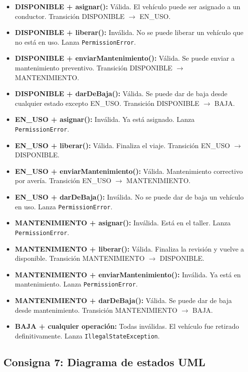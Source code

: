 \begin{itemize}
    \item \textbf{DISPONIBLE + asignar():} Válida. El vehículo puede ser asignado a un conductor. Transición DISPONIBLE $\rightarrow$ EN\_USO.
    \item \textbf{DISPONIBLE + liberar():} Inválida. No se puede liberar un vehículo que no está en uso. Lanza \texttt{PermissionError}.
    \item \textbf{DISPONIBLE + enviarMantenimiento():} Válida. Se puede enviar a mantenimiento preventivo. Transición DISPONIBLE $\rightarrow$ MANTENIMIENTO.
    \item \textbf{DISPONIBLE + darDeBaja():} Válida. Se puede dar de baja desde cualquier estado excepto EN\_USO. Transición DISPONIBLE $\rightarrow$ BAJA.
    \item \textbf{EN\_USO + asignar():} Inválida. Ya está asignado. Lanza \texttt{PermissionError}.
    \item \textbf{EN\_USO + liberar():} Válida. Finaliza el viaje. Transición EN\_USO $\rightarrow$ DISPONIBLE.
    \item \textbf{EN\_USO + enviarMantenimiento():} Válida. Mantenimiento correctivo por avería. Transición EN\_USO $\rightarrow$ MANTENIMIENTO.
    \item \textbf{EN\_USO + darDeBaja():} Inválida. No se puede dar de baja un vehículo en uso. Lanza \texttt{PermissionError}.
    \item \textbf{MANTENIMIENTO + asignar():} Inválida. Está en el taller. Lanza \texttt{PermissionError}.
    \item \textbf{MANTENIMIENTO + liberar():} Válida. Finaliza la revisión y vuelve a disponible. Transición MANTENIMIENTO $\rightarrow$ DISPONIBLE.
    \item \textbf{MANTENIMIENTO + enviarMantenimiento():} Inválida. Ya está en mantenimiento. Lanza \texttt{PermissionError}.
    \item \textbf{MANTENIMIENTO + darDeBaja():} Válida. Se puede dar de baja desde mantenimiento. Transición MANTENIMIENTO $\rightarrow$ BAJA.
    \item \textbf{BAJA + cualquier operación:} Todas inválidas. El vehículo fue retirado definitivamente. Lanza \texttt{IllegalStateException}.
\end{itemize}

\subsection{Consigna 7: Diagrama de estados UML}

